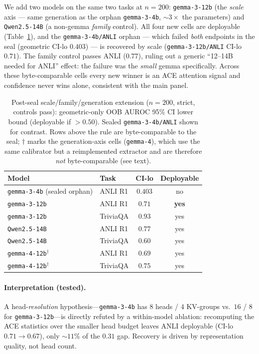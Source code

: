 \documentclass[11pt]{article}
\begin{document}
We add two models on the same two tasks at $n{=}200$: \texttt{gemma-3-12b} (the \emph{scale} axis ---
same generation as the orphan \texttt{gemma-3-4b}, $\sim\!3\times$ the parameters) and
\texttt{Qwen2.5-14B} (a non-gemma \emph{family} control). All four new cells are deployable
(Table~\ref{tab:ext}), and the \texttt{gemma-3-4b/ANLI} orphan --- which failed
\emph{both} endpoints in the seal (geometric CI-lo $0.403$) --- is recovered by scale
(\texttt{gemma-3-12b/ANLI} CI-lo $0.71$). The family control passes ANLI ($0.77$), ruling out a generic
``12--14B needed for ANLI'' effect: the failure was the \emph{small} gemma specifically. Across these
byte-comparable cells every new winner is an ACE attention signal and confidence never wins alone,
consistent with the main panel.

\begin{table}[tbp]
\centering
\caption{Post-seal scale/family/generation extension ($n{=}200$, strict, controls pass): geometric-only
OOB AUROC 95\% CI lower bound (deployable if $>0.50$). Sealed \texttt{gemma-3-4b/ANLI} shown for
contrast. Rows above the rule are byte-comparable to the seal; $\dagger$ marks the generation-axis
cells (\texttt{gemma-4}), which use the same calibrator but a reimplemented extractor and are therefore
\emph{not} byte-comparable (see text).}
\label{tab:ext}
\small
\begin{tabular}{llcc}
\toprule
Model & Task & CI-lo & Deployable \\
\midrule
\texttt{gemma-3-4b} (sealed orphan) & ANLI R1  & $0.403$ & no \\
\texttt{gemma-3-12b}                & ANLI R1  & $\mathbf{0.71}$ & \textbf{yes} \\
\texttt{gemma-3-12b}                & TriviaQA & $0.93$ & yes \\
\texttt{Qwen2.5-14B}                & ANLI R1  & $0.77$ & yes \\
\texttt{Qwen2.5-14B}                & TriviaQA & $0.60$ & yes \\
\midrule
\texttt{gemma-4-12b}$^\dagger$      & ANLI R1  & $0.69$ & yes \\
\texttt{gemma-4-12b}$^\dagger$      & TriviaQA & $0.75$ & yes \\
\bottomrule
\end{tabular}
\end{table}

\paragraph{Interpretation (tested).} A head-\emph{resolution} hypothesis---\texttt{gemma-3-4b} has
$8$ heads / $4$ KV-groups vs.\ $16$ / $8$ for \texttt{gemma-3-12b}---is directly refuted by a
within-model ablation: recomputing the ACE statistics over the smaller head budget leaves ANLI
deployable (CI-lo $0.71\!\to\!0.67$), only ${\sim}11\%$ of the $0.31$ gap. Recovery is driven by
representation quality, not head count.
\end{document}
